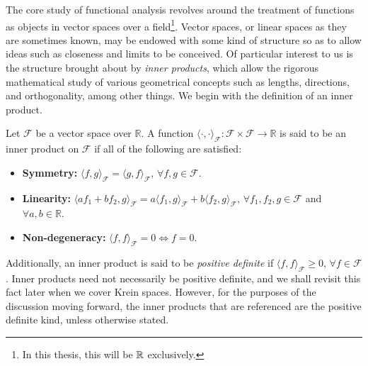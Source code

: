 The core study of functional analysis revolves around the treatment of functions as objects in vector spaces over a field\footnote{In this thesis, this will be $\mathbb{R}$ exclusively.}.
Vector spaces, or linear spaces as they are sometimes known, may be endowed with some kind of structure so as to allow ideas such as closeness and limits to be conceived.
Of particular interest to us is the structure brought about by \emph{inner products}, which allow the rigorous mathematical study of various geometrical concepts such as lengths, directions, and orthogonality, among other things.
We begin with the definition of an inner product. 

\begin{definition}\label{def:innerprod}
	Let $\mathcal F$ be a vector space over $\mathbb R$. A function $\langle\cdot,\cdot\rangle_{\mathcal F}:\mathcal F \times \mathcal F \rightarrow \mathbb R$ is said to be an inner product on $\mathcal F$ if all of the following are satisfied:
	\begin{itemize}
	\item \textbf{Symmetry:} $\langle f, g\rangle_{\mathcal F} = \langle g, f	\rangle_{\mathcal F}$, $\forall f,g \in \mathcal F$.
	\item \textbf{Linearity:} $\langle a f_1 + b f_2, g\rangle_{\mathcal F} = a\langle f_1,g \rangle_{\mathcal F} + b\langle f_2,g \rangle_{\mathcal F}$, $\forall f_1, f_2, g \in \mathcal F$ and $\forall a,b \in \mathbb R$.
	\item \textbf{Non-degeneracy:} $\langle f, f\rangle_{\mathcal F} = 0 \Leftrightarrow f=0$.
	\end{itemize}
\end{definition}

Additionally, an inner product is said to be \emph{positive definite} if $\langle f, f\rangle_{\mathcal F} \geq 0$, $\forall f \in \mathcal F$.
Inner products need not necessarily be positive definite, and we shall revisit this fact later when we cover Krein spaces.
However, for the purposes of the discussion moving forward, the inner products that are referenced are the positive definite kind, unless otherwise stated.

